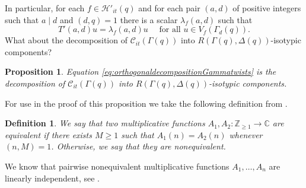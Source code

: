 \documentclass{article}
\newtheorem{prop}[thm]{Proposition}
\newtheorem{defi}[thm]{Definition}
\theoremstyle{named}
\newcommand{\C}{\mathcal{C}}
\newcommand{\HH}{\mathcal{H}}
\newcommand{\Z}{\mathbb{Z}}
\newcommand{\CC}{\mathbb{C}}
\begin{document}
In particular, for each $f \in \HH'_{it}(q)$ and for each pair $(a,d)$ of positive integers such that $a\mid d$ and $(d, q) = 1$ there is a scalar $\lambda_f(a, d)$ such that 
\begin{equation}\label{eq:eigenvaluegeneralheckeoperator}
    T'(a, d)u = \lambda_f(a, d)u \quad \text{ for all }u \in V_f(\Gamma_d(q)).
\end{equation} 
What about the decomposition of $\C_{it}(\Gamma(q))$  into $R(\Gamma(q), \Delta(q))$-isotypic components? 
\begin{prop}\label{prop:decompositiontintoisotypictwists}
Equation \eqref{eq:orthogonaldecompositionGammatwists} is the decomposition of $\C_{it}(\Gamma(q))$ into $R(\Gamma(q), \Delta(q))$-isotypic components.
\end{prop}
For use in the proof of this proposition we take the following definition from \cite{linearindependenceLfunctions}.
\begin{defi}
We say that two multiplicative functions $A_1, A_2: \Z_{\geq 1} \rightarrow \CC$ are \emph{equivalent} if there exists $M \geq 1$ such that $A_1(n) = A_2(n)$ whenever $(n, M) = 1$. Otherwise, we say that they are \emph{nonequivalent}.
\end{defi}
We know that pairwise nonequivalent multiplicative functions $A_1, \ldots, A_n$ are linearly independent, see \cite[Theorem 2]{linearindependenceLfunctions}.
\end{document}
